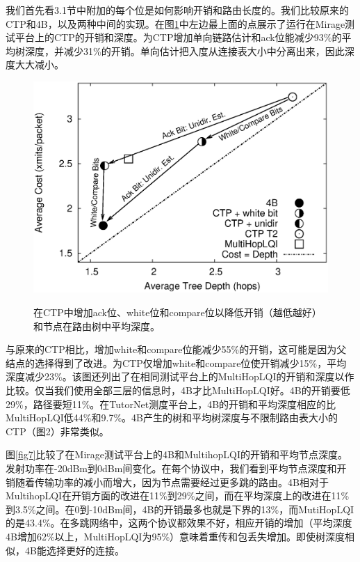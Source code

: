\documentclass[12pt,a4paper]{article}
\begin{document}
我们首先看3.1节中附加的每个位是如何影响开销和路由长度的。我们比较原来的CTP和4B，以及两种中间的实现。在图\ref{fig6}中左边最上面的点展示了运行在Mirage测试平台上的CTP的开销和深度。为CTP增加单向链路估计和ack位能减少93\%的平均树深度，并减少31\%的开销。单向估计把入度从连接表大小中分离出来，因此深度大大减小。

\begin{figure}[ht]
\centering
\includegraphics[scale=0.5]{figures/fig6}\label{fig6}
\caption{在CTP中增加ack位、white位和compare位以降低开销（越低越好）和节点在路由树中平均深度。}
\end{figure}

与原来的CTP相比，增加white和compare位能减少55\%的开销，这可能是因为父结点的选择得到了改进。为CTP仅增加white和compare位使开销减少15\%，平均深度减少23\%。该图还列出了在相同测试平台上的MultiHopLQI的开销和深度以作比较。仅当我们使用全部三层的信息时，4B才比MultiHopLQI好。4B的开销要低29\%，路径要短11\%。在TutorNet测度平台上，4B的开销和平均深度相应的比MultiHopLQI低44\%和9.7\%。4B产生的树和平均树深度与不限制路由表大小的CTP（图2）非常类似。

图\ref{fig7}比较了在Mirage测试平台上的4B和MultihopLQI的开销和平均节点深度。发射功率在-20dBm到0dBm间变化。在每个协议中，我们看到平均节点深度和开销随着传输功率的减小而增大，因为节点需要经过更多跳的路由。4B相对于MultihopLQI在开销方面的改进在11\%到29\%之间，而在平均深度上的改进在11\%到3.5\%之间。在0到-10dBm间，4B的开销最多也就是下界的13\%，而MutiHopLQI的是43.4\%。在多跳网络中，这两个协议都效果不好，相应开销的增加（平均深度4B增加62\%以上，MultiHopLQI为95\%）意味着重传和包丢失增加。即使树深度相似，4B能选择更好的连接。
\end{document}
